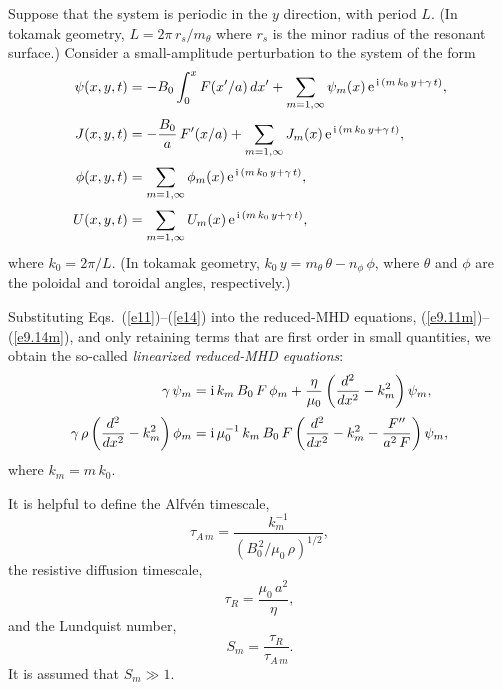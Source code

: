 \documentclass[12pt,prb,aps]{revtex4-1}
\begin{document}
Suppose that the system is periodic in the $y$ direction, with period $L$. (In tokamak geometry, $L=2\pi\,r_s/m_\theta$ where $r_s$ is the minor radius of the resonant surface.) Consider a small-amplitude perturbation to the system of the
form
\begin{align}\label{e11}
\psi(x,y,t) &= -B_0\int_0^xF(x'/a)\,dx' + \sum_{m=1,\infty}\psi_m(x)\,{\rm e}^{\,{\rm i}\,(m\,k_0\,y+\gamma\,t)},\\[0.5ex]
J(x,y,t) &= -\frac{B_0}{a}\,F'(x/a)+ \sum_{m=1,\infty}J_m(x)\,{\rm e}^{\,{\rm i}\,(m\,k_0\,y+\gamma\,t)},\\[0.5ex]
\phi(x,y,t) &=  \sum_{m=1,\infty}\phi_m(x)\,{\rm e}^{\,{\rm i}\,(m\,k_0\,y+\gamma\,t)},\\[0.5ex]
U(x,y,t) &=  \sum_{m=1,\infty}U_m(x)\,{\rm e}^{\,{\rm i}\,(m\,k_0\,y+\gamma\,t)},\label{e14}
\end{align}
where $k_0=2\pi/L$. (In tokamak geometry, $k_0\,y = m_\theta\,\theta-n_\phi\,\phi$, where $\theta$ and $\phi$
are the poloidal and toroidal angles, respectively.)

Substituting Eqs.~(\ref{e11})--(\ref{e14}) into the reduced-MHD equations, (\ref{e9.11m})--(\ref{e9.14m}), and
only retaining terms that are first order in small quantities, we obtain the so-called {\em linearized reduced-MHD equations}: 
\begin{align}
\gamma\,\psi_m &= {\rm i}\,k_m\,B_0\,F\,\phi_m +\frac{\eta}{\mu_0}\left(\frac{d^2}{dx^2}-k_m^{2}\right)\psi_m,\label{e15}
\\[0.5ex]
\gamma\,\rho\left(\frac{d^2}{dx^2}-k_m^{2}\right)\phi_m &= {\rm i}\,\mu_0^{-1}\,k_m\,B_0\,F\left(\frac{d^2}{dx^2}
-k_m^{2}-\frac{F''}{a^2\,F}\right)\psi_m,\label{e16}
\end{align}
where $k_m= m\,k_0$. 

It is helpful to define the Alfv\'{e}n timescale,
\begin{equation}
\tau_{A\,m} = \frac{k_m^{-1}}{(B_0^{\,2}/\mu_0\,\rho)^{1/2}},
\end{equation}
the resistive diffusion timescale,
\begin{equation}
\tau_R = \frac{\mu_0\,a^2}{\eta},
\end{equation}
and the Lundquist number,
\begin{equation}
S_m = \frac{\tau_R}{\tau_{A\,m}}.
\end{equation}
It is assumed that $S_m\gg 1$. 
\end{document}
